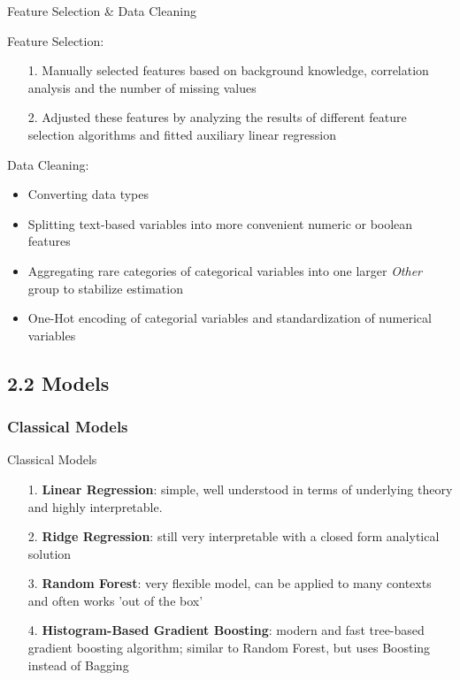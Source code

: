 \documentclass[ngerman,inputenc]{beamer}
\begin{document}
\begin{frame}{Feature Selection \& Data Cleaning}

  Feature Selection:
  \begin{itemize}
    \item[1.] Manually selected features based on background knowledge, correlation analysis and the number of missing values
    \item[2.] Adjusted these features by analyzing the results of different feature selection algorithms and fitted auxiliary linear regression
  \end{itemize}

  \pause

  \hspace{5pt}

  Data Cleaning:
  \begin{itemize}
    \item Converting data types
    \item Splitting text-based variables into more convenient numeric or boolean features
    \item Aggregating rare categories of categorical variables into one larger \emph{Other} group to stabilize estimation
    \item One-Hot encoding of categorial variables and standardization of numerical variables
  \end{itemize}

\end{frame}



\subsection{2.2 Models}

\subsubsection{Classical Models}

\begin{frame}{Classical Models}
  \begin{itemize}
    \item[1.] \textbf{Linear Regression}: simple, well understood in terms of underlying theory and highly interpretable.
    \item[2.] \textbf{Ridge Regression}: still very interpretable with a closed form analytical solution
    \item[3.] \textbf{Random Forest}: very flexible model, can be applied to many contexts and often works 'out of the box'
    \item[4.] \textbf{Histogram-Based Gradient Boosting}: modern and fast tree-based gradient boosting algorithm; similar to Random Forest, but uses Boosting instead of Bagging
  \end{itemize}

\end{frame}
\end{document}
